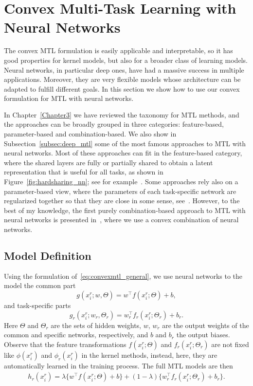 \section{Convex Multi-Task Learning with Neural Networks}\label{sec:convexmlt_network}
The convex MTL formulation is easily applicable and interpretable, so it has good properties for kernel models, but also for a broader class of learning models.
Neural networks, in particular deep ones, have had a massive success in multiple applications. Moreover, they are very flexible models whose architecture can be adapted to fulfill different goals. In this section we show how to use our convex formulation for MTL with neural networks.

%
In Chapter~\ref{Chapter3} we have reviewed the taxonomy for MTL methods, and the approaches can be broadly grouped in three categories: feature-based, parameter-based and combination-based. 
We also show in Subsection~\ref{subsec:deep_mtl} some of the most famous approaches to MTL with neural networks. Most of these approaches can fit in the feature-based category, where the shared layers are fully or partially shared to obtain a latent representation that is useful for all tasks, as shown in Figure~\ref{fig:hardsharing_nn}; see for example~\cite{Caruana97, MisraSGH16,RuderBAS17}. Some approaches rely also on a parameter-based view, where the parameters of each task-specific network are regularized together so that they are close in some sense, see~\cite{Long015a, YangH17a}.
However, to the best of my knowledge, the first purely combination-based approach to MTL with neural networks is presented in~\cite{RuizAD22_hais}, where we use a convex combination of neural networks.



\subsection{Model Definition}
Using the formulation of~\eqref{eq:convexmtl_general}, we use neural networks to the model the common part 
$$ g(x_i^r; w, \Theta) = w^\intercal f(x_i^r; \Theta) + b,$$
and task-specific parts
$$ g_r(x_i^r; w_r, \Theta_r) =  w_r^\intercal f_r(x_i^r; \Theta_r) + b_r.$$
Here $\Theta$ and $\Theta_r$ are the sets of hidden weights, $w$, $w_r$ are the output weights of the common and specific networks, respectively, and $b$ and $b_r$ the output biases.
Observe that the feature transformations $ f(x_i^r; \Theta)$ and $f_r(x_i^r; \Theta_r)$ are not fixed like $\phi(x_i^r)$ and $\phi_r(x_i^r)$ in the kernel methods, instead, here, they are automatically learned in the training process.
The full MTL models are then
\begin{equation}
    \label{eq:convexmtl_nn}
    \begin{aligned}
        h_r(x_i^r)
       = \lambda \lbrace w^\intercal f(x_i^r; \Theta) + b \rbrace + (1 - \lambda) \lbrace w_r^\intercal f_r(x_i^r; \Theta_r) + b_r \rbrace.
    \end{aligned}    
\end{equation}

